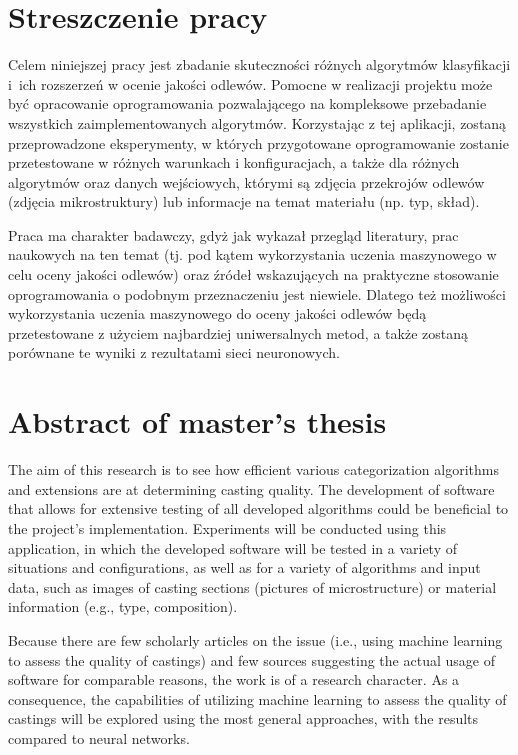 \section*{Streszczenie pracy}

Celem niniejszej pracy jest zbadanie skuteczności różnych algorytmów klasyfikacji i~ich rozszerzeń w ocenie jakości odlewów. Pomocne w realizacji projektu może być opracowanie oprogramowania pozwalającego na kompleksowe przebadanie wszystkich zaimplementowanych algorytmów. Korzystając z tej aplikacji, zostaną przeprowadzone eksperymenty, w których przygotowane oprogramowanie zostanie przetestowane w różnych warunkach i konfiguracjach, a także dla różnych algorytmów oraz danych wejściowych, którymi są zdjęcia przekrojów odlewów (zdjęcia mikrostruktury) lub informacje na temat materiału (np. typ, skład). 

Praca ma charakter badawczy, gdyż jak wykazał przegląd literatury, prac naukowych na ten temat (tj. pod kątem wykorzystania uczenia maszynowego w celu oceny jakości odlewów) oraz źródeł wskazujących na praktyczne stosowanie oprogramowania o podobnym przeznaczeniu jest niewiele. Dlatego też możliwości wykorzystania uczenia maszynowego do oceny jakości odlewów będą przetestowane z użyciem najbardziej uniwersalnych metod, a także zostaną porównane te wyniki z rezultatami sieci neuronowych.


\section*{Abstract of master's thesis}

The aim of this research is to see how efficient various categorization algorithms and extensions are at determining casting quality. The development of software that allows for extensive testing of all developed algorithms could be beneficial to the project's implementation. Experiments will be conducted using this application, in which the developed software will be tested in a variety of situations and configurations, as well as for a variety of algorithms and input data, such as images of casting sections (pictures of microstructure) or material information (e.g., type, composition).

Because there are few scholarly articles on the issue (i.e., using machine learning to assess the quality of castings) and few sources suggesting the actual usage of software for comparable reasons, the work is of a research character. As a consequence, the capabilities of utilizing machine learning to assess the quality of castings will be explored using the most general approaches, with the results compared to neural networks.


















